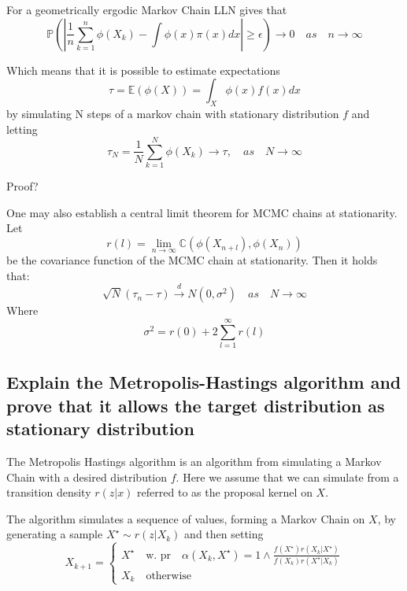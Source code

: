 \documentclass[a4paper]{article}
\begin{document}
For a geometrically ergodic Markov Chain LLN gives that
\begin{equation}
    \mathbb{P}\left(|\frac{1}{n}\sum_{k=1}^n\phi(X_k) - \int\phi(x)\pi(x)dx| \geq \epsilon\right) \rightarrow 0 \quad as \quad n\rightarrow\infty
\end{equation}

Which means that it is possible to estimate expectations
\begin{equation}
    \tau = \mathbb{E}(\phi(X)) = \int_X\phi(x)f(x)dx
\end{equation}
by simulating N steps of a markov chain with stationary distribution $f$ and letting
\begin{equation}
    \tau_N = \frac{1}{N}\sum_{k=1}^N\phi(X_k) \rightarrow \tau, \quad as \quad N \rightarrow \infty
\end{equation}

Proof?

One may also establish a central limit theorem for MCMC chains at stationarity. Let
\begin{equation}
    r(l) = \lim_{n\to \infty}\mathbb{C}(\phi(X_{n+l}),\phi(X_n))
\end{equation}
be the covariance function of the MCMC chain at stationarity. Then it holds that:
\begin{equation}
    \sqrt{N}(\tau_n-\tau) \overset{d}{\rightarrow} N(0,\sigma^2) \quad as \quad N \rightarrow \infty
\end{equation}
Where
\begin{equation}
    \sigma^2 = r(0) + 2\sum_{l=1}^\infty r(l)
\end{equation}

\newpage

\subsection[The Metropolis-Hastings algorithm]{Explain the Metropolis-Hastings algorithm and prove that it allows the target distribution as
stationary distribution}

The Metropolis Hastings algorithm is an algorithm from simulating a Markov Chain with a desired distribution $f$. Here we assume that we can simulate from a transition density $r(z|x)$ referred to as the proposal kernel on $X$.

The algorithm simulates a sequence of values, forming a Markov Chain on $X$, by generating a sample $X^\star \sim r(z|X_k)$ and then setting
\begin{equation}
    X_{k+1} = 
    \begin{cases}
        X^\star \quad \text{w. pr} \quad \alpha(X_k,X^\star) = 1 \wedge \frac{f(X^\star)r(X_k|X^\star)}{f(X_k)r(X^\star|X_k)} \\
        X_k \quad \text{otherwise}
    \end{cases}
\end{equation}
\end{document}

